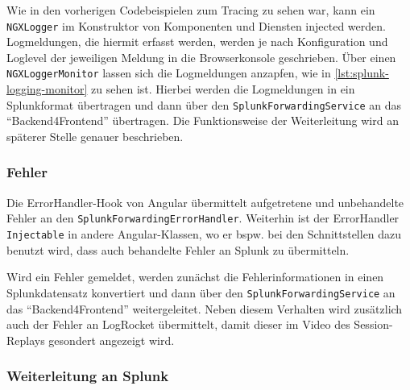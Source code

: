 Wie in den vorherigen Codebeispielen zum Tracing zu sehen war, kann ein \texttt{NGXLogger} im Konstruktor von Komponenten und Diensten injected werden. Logmeldungen, die hiermit erfasst werden, werden je nach Konfiguration und Loglevel der jeweiligen Meldung in die Browserkonsole geschrieben. Über einen \texttt{NGXLoggerMonitor} lassen sich die Logmeldungen anzapfen, wie in \autoref{lst:splunk-logging-monitor} zu sehen ist. Hierbei werden die Logmeldungen in ein Splunkformat übertragen und dann über den \texttt{SplunkForwardingService} an das \enquote{Backend4Frontend} übertragen. Die Funktionsweise der Weiterleitung wird an späterer Stelle genauer beschrieben.



\subsubsection{Fehler}

Die ErrorHandler-Hook von Angular übermittelt aufgetretene und unbehandelte Fehler an den \texttt{SplunkForwardingErrorHandler}. Weiterhin ist der ErrorHandler \texttt{Injectable} in andere Angular-Klassen, wo er bspw. bei den Schnittstellen dazu benutzt wird, dass auch behandelte Fehler an Splunk zu übermitteln.

Wird ein Fehler gemeldet, werden zunächst die Fehlerinformationen in einen Splunkdatensatz konvertiert und dann über den \texttt{SplunkForwardingService} an das \enquote{Backend4Frontend} weitergeleitet. Neben diesem Verhalten wird zusätzlich auch der Fehler an LogRocket übermittelt, damit dieser im Video des Session-Replays gesondert angezeigt wird.



\subsubsection{Weiterleitung an Splunk}

